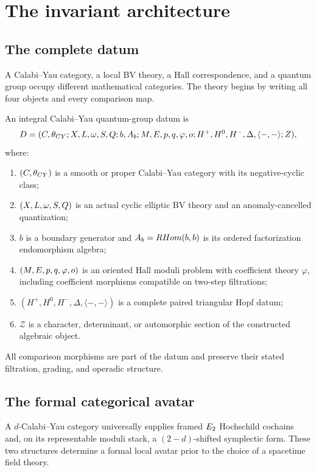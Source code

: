
\part{The invariant architecture}
\chapter{The complete datum}
A Calabi--Yau category, a local BV theory, a Hall correspondence, and a quantum group occupy different mathematical categories.  The theory begins by writing all four objects and every comparison map.

\begin{definition}
An integral Calabi--Yau quantum-group datum is
\[
 D=(C,\theta_{CY};X,L,\omega,S,Q;
 b,A_b;M,E,p,q,\varphi,o;
 H^+,H^0,H^-,\Delta,\langle-,-\rangle;Z),
\]
where:
\begin{enumerate}
\item $(C,\theta_{CY})$ is a smooth or proper Calabi--Yau category with its negative-cyclic class;
\item $(X,L,\omega,S,Q)$ is an actual cyclic elliptic BV theory and an anomaly-cancelled quantization;
\item $b$ is a boundary generator and $A_b=RHom(b,b)$ is its ordered factorization endomorphism algebra;
\item $(M,E,p,q,\varphi,o)$ is an oriented Hall moduli problem with coefficient theory $\varphi$, including coefficient morphisms compatible on two-step filtrations;
\item $(H^+,H^0,H^-,\Delta,\langle-,-\rangle)$ is a complete paired triangular Hopf datum;
\item $\mathcal Z$ is a character, determinant, or automorphic section of the constructed algebraic object.
\end{enumerate}
All comparison morphisms are part of the datum and preserve their stated filtration, grading, and operadic structure.
\end{definition}

\chapter{The formal categorical avatar}
A $d$-Calabi--Yau category universally supplies framed $E_2$ Hochschild cochains and, on its representable moduli stack, a $(2-d)$-shifted symplectic form.  These two structures determine a formal local avatar prior to the choice of a spacetime field theory.

